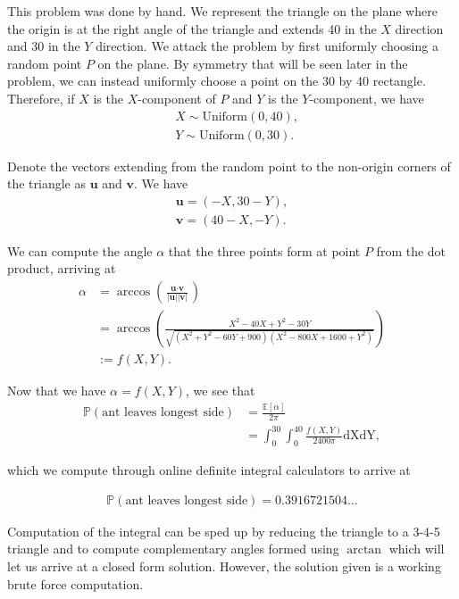 \documentclass[12pt]{article}
\begin{document}
 
\noindent
This problem was done by hand. We represent the triangle on the plane where the origin is at the right angle of the triangle and extends 40 in the $X$ direction and 30 in the $Y$ direction. We attack the problem by first uniformly choosing a random point $P$ on the plane. By symmetry that will be seen later in the problem, we can instead uniformly choose a point on the 30 by 40 rectangle. Therefore, if $X$ is the $X$-component of $P$ and $Y$ is the $Y$-component, we have
\begin{align*}
    &X \sim \text{Uniform}(0, 40),\\
    &Y \sim \text{Uniform}(0, 30).
\end{align*}

\noindent
Denote the vectors extending from the random point to the non-origin corners of the triangle as $\textbf{u}$ and $\textbf{v}$. We have
\begin{align*}
    \textbf{u} = (-X, 30 - Y),\\
    \textbf{v} = (40 - X, -Y).
\end{align*}

\noindent
We can compute the angle $\alpha$ that the three points form at point $P$ from the dot product, arriving at
\begin{align*}
    \alpha &= \arccos\left(\frac{\textbf{u} \cdot \textbf{v}}{|\textbf{u}| |\textbf{v}|}\right)\\
    &= \arccos\left(\frac{X^2 - 40X + Y^2 - 30Y}{\sqrt{(X^2 + Y^2 - 60Y + 900)(X^2 - 800X + 1600 + Y^2)}}\right)\\
    &:= f(X, Y).
\end{align*}

\noindent
Now that we have $\alpha = f(X, Y)$, we see that 
\begin{align*}
    \mathbb{P}(\text{ant leaves longest side}) &= \frac{\mathbb{E}[\alpha]}{2\pi}\\
    &= \int_0^{30}\int_0^{40} \frac{f(X, Y)}{2400\pi} \text{dX}\text{dY},
\end{align*}

\noindent
which we compute through online definite integral calculators to arrive at

\begin{align*}
    \mathbb{P}(\text{ant leaves longest side}) = 0.3916721504...
\end{align*}

\noindent
Computation of the integral can be sped up by reducing the triangle to a 3-4-5 triangle and to compute complementary angles formed using $\arctan$ which will let us arrive at a closed form solution. However, the solution given is a working brute force computation.
\end{document}
